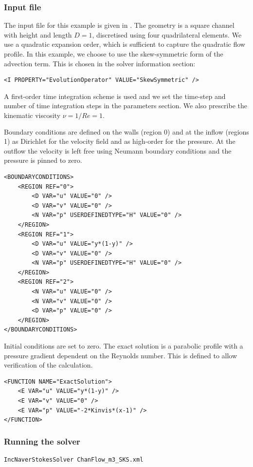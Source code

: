 \subsubsection{Input file}
The input file for this example is given in . The
geometry is a square channel with height and length $D=1$, discretised using
four quadrilateral elements. We use a quadratic expansion order, which is
sufficient to capture the quadratic flow profile. In this example, we choose to
use the skew-symmetric form of the advection term. This is chosen in the solver
information section:
\begin{lstlisting}[style=XMLStyle]
<I PROPERTY="EvolutionOperator" VALUE="SkewSymmetric" />
\end{lstlisting}
A first-order time integration scheme is used and we set the time-step and
number of time integration steps in the parameters section. We also prescribe
the kinematic viscosity $\nu = 1/Re = 1$.

Boundary conditions are defined on the walls (region 0) and at the inflow
(regions 1) as Dirichlet for the velocity field and as high-order for the
pressure. At the outflow the velocity is left free using Neumann boundary
conditions and the pressure is pinned to zero.
\begin{lstlisting}[style=XMLStyle]
<BOUNDARYCONDITIONS>
    <REGION REF="0">
        <D VAR="u" VALUE="0" />
        <D VAR="v" VALUE="0" />
        <N VAR="p" USERDEFINEDTYPE="H" VALUE="0" />
    </REGION>
    <REGION REF="1">
        <D VAR="u" VALUE="y*(1-y)" />
        <D VAR="v" VALUE="0" />
        <N VAR="p" USERDEFINEDTYPE="H" VALUE="0" />
    </REGION>
    <REGION REF="2">
        <N VAR="u" VALUE="0" />
        <N VAR="v" VALUE="0" />
        <D VAR="p" VALUE="0" />
    </REGION>
</BOUNDARYCONDITIONS>
\end{lstlisting}

Initial conditions are set to zero. The exact solution is a parabolic profile
with a pressure gradient dependent on the Reynolds number. This is defined to
allow verification of the calculation.
\begin{lstlisting}[style=XMLStyle]
<FUNCTION NAME="ExactSolution">
    <E VAR="u" VALUE="y*(1-y)" />
    <E VAR="v" VALUE="0" />
    <E VAR="p" VALUE="-2*Kinvis*(x-1)" />
</FUNCTION>
\end{lstlisting}

\subsubsection{Running the solver}
\begin{lstlisting}[style=BashInputStyle]
IncNaverStokesSolver ChanFlow_m3_SKS.xml
\end{lstlisting}


